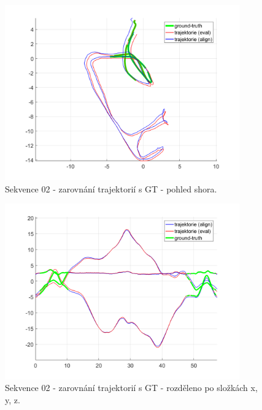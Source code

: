 \documentclass[12pt,a4paper]{report}
\begin{document}
\begin{figure}[H]
\centering
\includegraphics[width=0.9\textwidth]{img/m_dso_02_2.png}
\caption{Sekvence 02 - zarovnání trajektorií s GT - pohled shora.}
\end{figure}

\begin{figure}[H]
\centering
\includegraphics[width=0.9\textwidth]{img/m_dso_11_1.png}
\caption{Sekvence 02 - zarovnání trajektorií s GT - rozděleno po složkách x, y, z.}
\end{figure}
\end{document}
